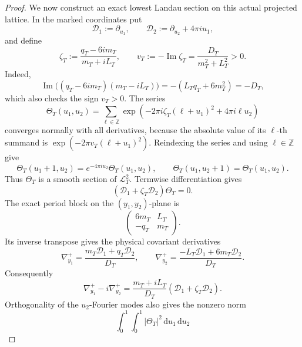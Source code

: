 \begin{proof}
We now construct an exact lowest Landau section on this actual projected
lattice.  In the marked coordinates put
\[
 \mathcal D_1:=\partial_{u_1},
 \qquad
 \mathcal D_2:=\partial_{u_2}+4\pi i u_1,
\]
and define
\begin{equation}
 \zeta_T:=\frac{q_T-6im_T}{m_T+iL_T},
 \qquad
 v_T:=-\operatorname{Im}\zeta_T
     =\frac{D_T}{m_T^2+L_T^2}>0.
 \label{cusp-magnetic-theta-parameter}
\end{equation}
Indeed,
\[
 \operatorname{Im}\bigl((q_T-6im_T)(m_T-iL_T)\bigr)
 =-(L_Tq_T+6m_T^2)=-D_T,
\]
which also checks the sign \(v_T>0\).
The series
\begin{equation}
 \Theta_T(u_1,u_2)
 =\sum_{\ell\in\mathbb Z}
 \exp\!\left(
  -2\pi i\zeta_T(\ell+u_1)^2+4\pi i\ell u_2
 \right)
 \label{cusp-magnetic-theta-series}
\end{equation}
converges normally with all derivatives, because the absolute value of
its \(\ell\)-th summand is
\(\exp(-2\pi v_T(\ell+u_1)^2)\).  Reindexing the series and using
\(\ell\in\mathbb Z\) give
\begin{equation}
 \Theta_T(u_1+1,u_2)=e^{-4\pi i u_2}\Theta_T(u_1,u_2),
 \qquad
 \Theta_T(u_1,u_2+1)=\Theta_T(u_1,u_2).
 \label{cusp-magnetic-theta-automorphy}
\end{equation}
Thus \(\Theta_T\) is a smooth section of \(\mathscr L_T^2\).  Termwise
differentiation gives
\begin{equation}
 (\mathcal D_1+\zeta_T\mathcal D_2)\Theta_T=0.
 \label{cusp-magnetic-theta-marked-equation}
\end{equation}
The exact period block on the \((y_1,y_2)\)-plane is
\[
 \begin{pmatrix}6m_T&L_T\\-q_T&m_T\end{pmatrix}.
\]
Its inverse transpose gives the physical covariant derivatives
\begin{equation}
 \nabla_{y_1}^+
  =\frac{m_T\mathcal D_1+q_T\mathcal D_2}{D_T},
 \qquad
 \nabla_{y_2}^+
  =\frac{-L_T\mathcal D_1+6m_T\mathcal D_2}{D_T}.
 \label{cusp-magnetic-physical-root-derivatives}
\end{equation}
Consequently
\begin{equation}
 \nabla_{y_1}^+-i\nabla_{y_2}^+
 =\frac{m_T+iL_T}{D_T}
   (\mathcal D_1+\zeta_T\mathcal D_2).
 \label{cusp-magnetic-annihilator-conversion}
\end{equation}
Orthogonality of the \(u_2\)-Fourier modes also gives the nonzero norm
\[
 \int_0^1\!\!\int_0^1\lvert\Theta_T\rvert^2
 \,\mathrm du_1\,\mathrm du_2
\]
\end{proof}
